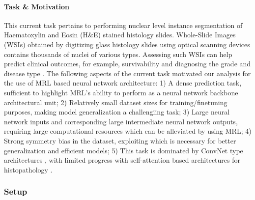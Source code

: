 \documentclass{article}
\begin{document}
\paragraph{Task \& Motivation} This current task pertains to performing nuclear level instance segmentation of Haematoxylin and Eosin (H\&E) stained histology slides.  Whole-Slide Images (WSIs) obtained by digitizing glass histology slides using optical scanning devices contains thousands of nuclei of various types. Assessing such WSIs can help predict clinical outcomes, for example, survivability \cite{10.1117/tumordiff} and diagnosing the grade and disease type \cite{Lu2018-as}. The following aspects of the current task motivated our analysis for the use of MRL based neural network architecture: 1) A dense prediction task, sufficient to highlight MRL's ability to perform as a neural network backbone architectural unit; 2) Relatively small dataset sizes for training/finetuning purposes, making model generalization a challengiing task; 3) Large neural network inputs and corresponding large intermediate neural network outputs, requiring large computational resources which can be alleviated by using MRL; 4) Strong symmetry bias in the dataset, exploiting which is necessary for better generalization and efficient models; 5) This task is dominated by ConvNet type architectures \cite{DBLP:journals/corr/hovernet, DSF-CNN, cdnet, Brp-net}, with limited progress with self-attention based architectures for histopathology \cite{DBLP:journals/corr/GasHis, shao2021transmil, transpath}.  

\subsubsection{Setup}
\end{document}
